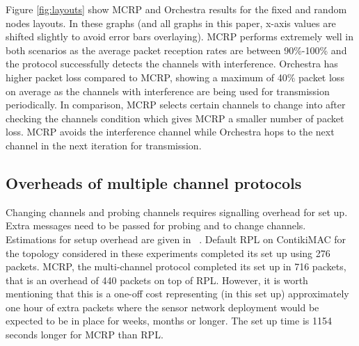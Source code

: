 Figure \ref{fig:layouts} show MCRP and Orchestra results for the fixed and random nodes layouts.  In these graphs (and all graphs in this paper, x-axis values are shifted slightly to avoid error bars overlaying).
MCRP performs extremely well in both scenarios as the average packet reception rates are between 90\%-100\% and the protocol successfully detects the channels with interference.
Orchestra has higher packet loss compared to MCRP, showing a maximum of 40\% packet loss on average as the channels with interference are being used for transmission periodically. 
In comparison, MCRP selects certain channels to change into after checking the channels condition which gives MCRP a smaller number of packet loss.
MCRP avoids the interference channel while Orchestra hops to the next channel in the next iteration for transmission.

\subsection{Overheads of multiple channel protocols}

Changing channels and probing channels requires signalling overhead for set up.  Extra messages need to be passed for probing and to change channels.  Estimations for setup overhead are given in ~\cite{mcrp}.  Default RPL on ContikiMAC for the topology considered in these experiments completed its set up using 276 packets. MCRP, the multi-channel protocol completed its set up in 716 packets, that is an overhead of 440 packets on top of RPL.  However, it is worth mentioning that this is a one-off cost representing (in this set up) approximately one hour of extra packets where the sensor network deployment would be expected to be in place for weeks, months or longer.  The set up time is 1154 seconds longer for MCRP than RPL.


